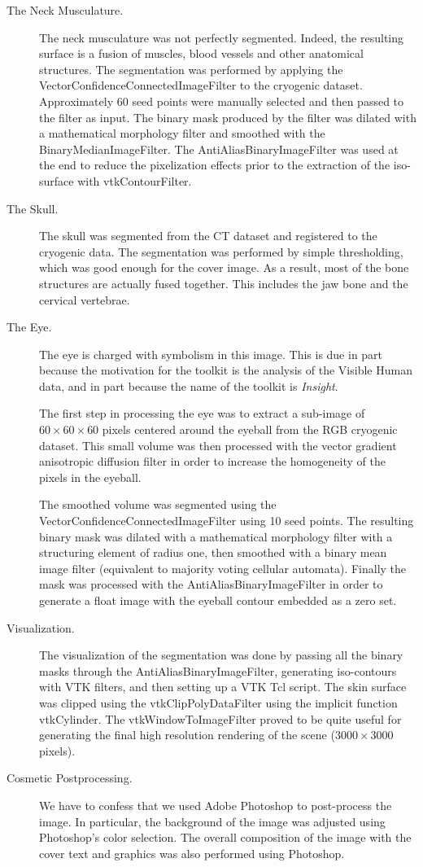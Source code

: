 \begin{description}
\item[The Neck Musculature.]
The neck musculature was not perfectly segmented. Indeed, the resulting
surface is a fusion of muscles, blood vessels and other anatomical
structures. The segmentation was performed by applying the
VectorConfidenceConnectedImageFilter to the cryogenic dataset. Approximately
60 seed points were manually selected and then passed to the filter as
input. The binary mask produced by the filter was dilated with a mathematical
morphology filter and smoothed with the BinaryMedianImageFilter. The
AntiAliasBinaryImageFilter was used at the end to reduce the pixelization
effects prior to the extraction of the iso-surface with vtkContourFilter.

\item[The Skull.]
The skull was segmented from the CT dataset and registered to the cryogenic
data. The segmentation was performed by simple thresholding, which was good
enough for the cover image. As a result, most of the bone structures are
actually fused together. This includes the jaw bone and the cervical
vertebrae.

\item[The Eye.]
The eye is charged with symbolism in this image. This is due in part because
the motivation for the toolkit is the analysis of the Visible Human data,
and in part because the name of the toolkit is \emph{Insight}.

The first step in processing the eye was to extract a sub-image of
$60\times60\times60$ pixels centered around the eyeball from the RGB
cryogenic dataset. This small volume was then processed with the vector
gradient anisotropic diffusion filter in order to increase the homogeneity of
the pixels in the eyeball.

The smoothed volume was segmented using the
VectorConfidenceConnectedImageFilter using 10 seed points. The resulting
binary mask was dilated with a mathematical morphology filter with a
structuring element of radius one, then smoothed with a binary mean image
filter (equivalent to majority voting cellular automata). Finally the mask
was processed with the AntiAliasBinaryImageFilter in order to generate a
float image with the eyeball contour embedded as a zero set.

\item[Visualization.]
The visualization of the segmentation was done by passing all the binary
masks through the AntiAliasBinaryImageFilter, generating iso-contours with
VTK filters, and then setting up a VTK Tcl script. The skin surface was
clipped using the vtkClipPolyDataFilter using the implicit function
vtkCylinder. The vtkWindowToImageFilter proved to be quite useful for
generating the final high resolution rendering of the scene ($3000\times3000$
pixels).

\item[Cosmetic Postprocessing.]
We have to confess that we used Adobe Photoshop to post-process the image. In
particular, the background of the image was adjusted using Photoshop's color
selection. The overall composition of the image with the cover text and
graphics was also performed using Photoshop.

\end{description}

\normalsize
